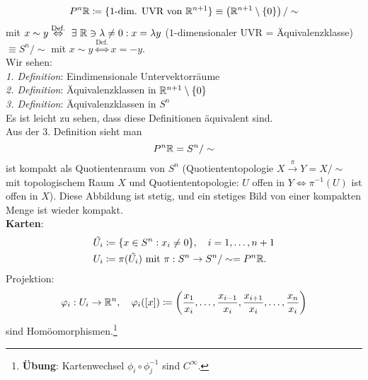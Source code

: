 \begin{example}
\begin{enumerate}
\begin{equation*}
        P^n\mathbb{R} \coloneqq \{ \text{1-dim. UVR von } \mathbb{R}^{n+1} \} \equiv \left( \mathbb{R}^{n+1} \setminus \{ 0 \} \right) /\sim
      \end{equation*}
      mit \( x \sim y \overset{\text{Def.}}{\Leftrightarrow} \ \exists \ \mathbb{R} \ni \lambda \neq 0 : x = \lambda y \) (\( 1 \)-dimensionaler UVR = Äquivalenzklasse) \( \equiv S^n/\sim \) mit \( x \sim y \overset{\text{Def.}}{\Leftrightarrow} x = -y \). \\
      Wir sehen: \\
      \emph{1. Definition}: Eindimensionale Untervektorräume \\
      \emph{2. Definition}: Äquivalenzklassen in \( \mathbb{R}^{n+1} \setminus \{ 0 \} \) \\
      \emph{3. Definition}: Äquivalenzklassen in \( S^n \) \\
      Es ist leicht zu sehen, dass diese Definitionen äquivalent sind. \\
      Aus der 3. Definition sieht man
      \begin{equation*}
        P^n\mathbb{R} = S^n/\sim
      \end{equation*}
      ist kompakt als Quotientenraum von \( S^n \) (Quotiententopologie \( X \overset{\pi}{\to} Y = X/\sim \) mit topologischem Raum \( X \) und Quotiententopologie: \( U \) offen in \( Y \Leftrightarrow \pi^{-1}(U) \) ist offen in \( X \)). Diese Abbildung ist stetig, und ein stetiges Bild von einer kompakten Menge ist wieder kompakt. \\
      \textbf{Karten}:
      \begin{align*}
        \tilde{U_i} &\coloneqq \{ x \in S^n : x_i \neq 0 \}, \quad i = 1, \dots, n+1 \\
        U_i &\coloneqq \pi(\tilde{U_i}) \text{ mit } \pi: S^n \to S^n/\sim = P^n\mathbb{R}\text{.}
      \end{align*}
      Projektion:
      \begin{equation*}
        \varphi_i : U_i \to \mathbb{R}^n, \quad \varphi_i([x]) \coloneqq \left( \frac{x_1}{x_i}, \dots, \frac{x_{i-1}}{x_i}, \frac{x_{i+1}}{x_i}, \dots, \frac{x_n}{x_i} \right)
      \end{equation*}
      sind Homöomorphismen.\footnote{\textbf{Übung}: Kartenwechsel \( \phi_i \circ \phi_j^{-1} \) sind \( C^\infty \).}
  \end{enumerate}
\end{example}


